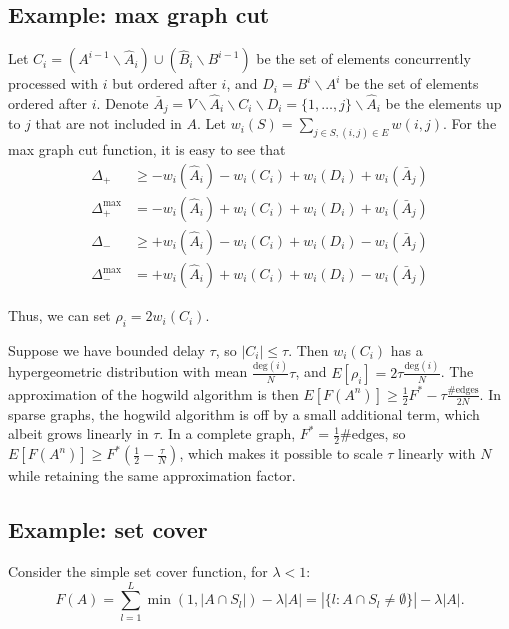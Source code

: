 \subsection{Example: max graph cut}
Let $C_i = (A^{i-1}\backslash \hat{A}_i) \cup (\hat{B}_i\backslash B^{i-1})$ be the set of elements concurrently processed with $i$ but ordered after $i$, and $D_i = B^i\backslash A^i$ be the set of elements ordered after $i$.
Denote $\bar{A}_j = V\backslash \hat{A}_i\backslash C_i\backslash D_i = \{1,\dots,j\}\backslash \hat{A}_i$ be the elements up to $j$ that are not included in $A$.
Let $w_i(S) = \sum_{j\in S, (i,j)\in E} w(i,j)$.
For the max graph cut function, it is easy to see that 
\begin{align*}
\Delta_+        &\geq - w_i(\hat{A}_i) -w_i(C_i) + w_i(D_i) + w_i(\bar{A}_j)\\
\Delta_+^{\max} &=    - w_i(\hat{A}_i) + w_i(C_i) + w_i(D_i) + w_i(\bar{A}_j)\\
\Delta_-        &\geq + w_i(\hat{A}_i) - w_i(C_i) + w_i(D_i) - w_i(\bar{A}_j)\\
\Delta_-^{\max} &= + w_i(\hat{A}_i) + w_i(C_i) + w_i(D_i) - w_i(\bar{A}_j)
\end{align*}

Thus, we can set $\rho_i = 2w_i(C_i)$.

Suppose we have bounded delay $\tau$, so $|C_i| \leq \tau$.
Then $w_i(C_i)$ has a hypergeometric distribution with mean $\frac{\text{deg}(i)}{N}\tau$, and $E[\rho_i] = 2\tau\frac{\text{deg}(i)}{N}$.
The approximation of the hogwild algorithm is then $E[F(A^n)] \geq \frac{1}{2} F^* - \tau\frac{\#\text{edges}}{2N}$.
In sparse graphs, the hogwild algorithm is off by a small additional term, which albeit grows linearly in $\tau$.
In a complete graph, $F^* = \frac{1}{2}\#\text{edges}$, so $E[F(A^n)] \geq F^*\left(\frac{1}{2} - \frac{\tau}{N}\right)$, which makes it possible to scale $\tau$ linearly with $N$ while retaining the same approximation factor.



\subsection{Example: set cover}

Consider the simple set cover function, for $\lambda < 1$:
\[ F(A) = \sum_{l=1}^L \min(1,|A\cap S_l|) - \lambda|A| = |\{l: A\cap S_l \neq\emptyset\}| - \lambda|A|.\]

